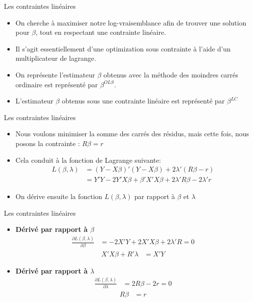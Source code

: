 \documentclass{beamer}
\begin{document}
\begin{frame}{Les contraintes linéaires}
\begin{itemize}
\item On cherche à maximiser notre log-vraisemblance afin de trouver une solution pour $\beta$, tout en respectant une contrainte linéaire. 
\item Il s'agit essentiellement d'une optimization sous contrainte à l'aide d'un multiplicateur de lagrange.
\item On représente l'estimateur $\beta$ obtenus avec la méthode des moindres carrés ordinaire est représenté par $\beta^{OLS}$.
\item L'estimateur $\beta$ obtenus sous une contrainte linéaire est représenté par $\beta^{LC}$

\end{itemize}
\end{frame}

\begin{frame}{Les contraintes linéaires}
\begin{itemize}
\item Nous voulons minimiser la somme des carrés des résidus, mais cette fois, nous posons la contrainte : $R \beta = r$
\item Cela conduit à la fonction de Lagrange suivante:
\begin{align*}
L(\beta,\lambda) & =(Y-X\beta)'(Y-X\beta)+2 \lambda'(R \beta-r)\\ & = Y'Y-2Y'X\beta +\beta' X'X \beta +2 \lambda' R\beta -2 \lambda'r
\end{align*}
\item On dérive ensuite la fonction $L(\beta,\lambda)$ par rapport à $\beta$ et $\lambda$
\end{itemize}

\end{frame}

\begin{frame}{Les contraintes linéaires}
    \begin{itemize}
        \item \textbf{Dérivé par rapport à $\beta$}
        \begin{align*}
            \frac{\partial L(\beta, \lambda)}{\partial \beta} &= -2 X'Y + 2X'X \beta + 2 \lambda'R = 0
        \end{align*}
        \begin{align*}
            X'X \beta + R'\lambda &= X'Y
        \end{align*}

        \item \textbf{Dérivé par rapport à $\lambda$}
        \begin{align*}
            \frac{\partial L(\beta, \lambda)}{\partial \lambda} &= 2R\beta - 2r = 0
        \end{align*}
        \begin{align*}
            R \beta &= r
        \end{align*}
    \end{itemize}
\end{frame}
\end{document}
